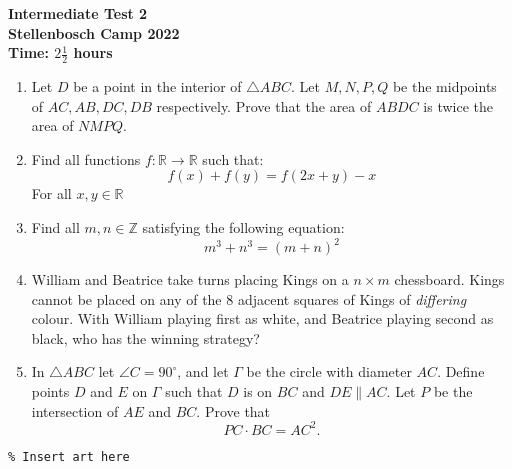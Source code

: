 \documentclass{article}
\begin{document}
\thispagestyle{empty}

\begin{center}
  \textbf{\Large Intermediate Test 2}
  \\ \vspace{1em}
  \textbf{\large Stellenbosch Camp 2022}
  \\ \vspace{1em}
  \textbf{\large Time: $2\frac{1}{2}$ hours}
\end{center}

\bigskip

\begin{enumerate}[itemsep=\fill]

\item %
Let $D$ be a point in the interior of $\triangle ABC$. Let $M,N,P,Q$ be the midpoints of $AC, AB, DC, DB$ respectively. Prove that the area of $ABDC$ is twice the area of $NMPQ$. 

\item %
Find all functions $f:\mathbb{R}\rightarrow\mathbb{R}$ such that:
\[f(x) + f(y) = f(2x+y) - x\] For all $x,y\in\mathbb{R}$

\item %
Find all $m,n\in \mathbb{Z}$ satisfying the following equation:
\[m^3 + n^3 = (m+n)^2\]

\item %
William and Beatrice take turns placing Kings on a $n \times m$ chessboard.
Kings cannot be placed on any of the 8 adjacent squares of Kings of \emph{differing} colour.
With William playing first as white, and Beatrice playing second as black, who has the winning strategy?

\item %
In $\triangle ABC$ let $\angle C = 90^\circ$, and let $\Gamma$ be the circle with diameter $AC$.
Define points $D$ and $E$ on $\Gamma$ such that $D$ is on $BC$ and $DE \parallel AC$.
Let $P$ be the intersection of $AE$ and $BC$.
Prove that
\[ PC \cdot BC = AC^2. \]

\end{enumerate}


\vfill
\centering
\small
\begin{BVerbatim}
\end{BVerbatim}
\end{document}
